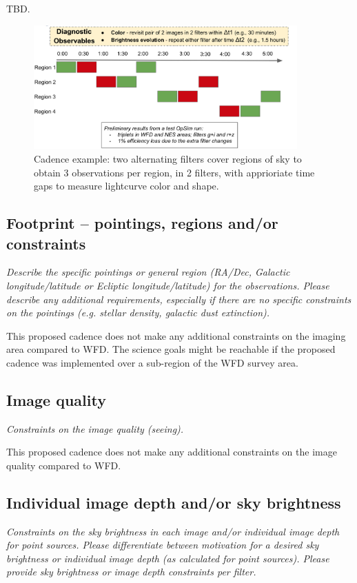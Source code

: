 \documentclass[11pt]{article}
\begin{document}
TBD.
\begin{figure}[!h]
\includegraphics[width=0.9\textwidth]{figures/highLevelCadence.png}
\caption{Cadence example: two alternating filters cover regions of sky to obtain 3 observations per region, in 2 filters, with apprioriate time gaps to measure lightcurve color and shape.}
\end{figure}

\subsection{Footprint -- pointings, regions and/or constraints}
\begin{footnotesize}{\it Describe the specific pointings or general region (RA/Dec, Galactic longitude/latitude or Ecliptic longitude/latitude) for the observations. Please describe any additional requirements, especially if there are no specific constraints on the pointings (e.g. stellar density, galactic dust extinction).}
\end{footnotesize}

This proposed cadence does not make any additional constraints on the imaging area compared to WFD. The science goals might be reachable if the proposed cadence was implemented over a sub-region of the WFD survey area.  

\subsection{Image quality}
\begin{footnotesize}{\it Constraints on the image quality (seeing).}\end{footnotesize}

This proposed cadence does not make any additional constraints on the image quality compared to WFD. 

\subsection{Individual image depth and/or sky brightness}
\begin{footnotesize}{\it Constraints on the sky brightness in each image and/or individual image depth for point sources. Please differentiate between motivation for a desired sky brightness or individual image depth (as calculated for point sources). Please provide sky brightness or image depth constraints per filter.}
\end{footnotesize}
\end{document}
